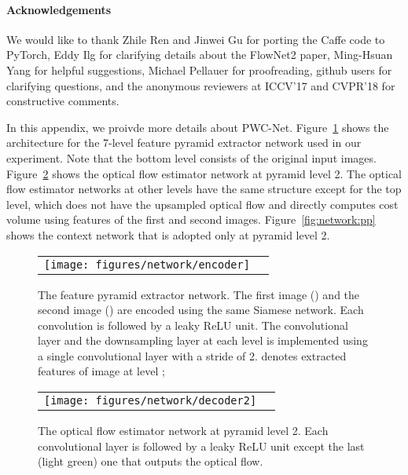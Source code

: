 \documentclass[10pt,journal,cspaper,compsoc]{IEEEtran}
\newcommand{\beforePara}{\vspace{-0em}}
\begin{document}
	\beforePara
	{
	\paragraph{Acknowledgements} We would like to thank Zhile Ren and Jinwei Gu for porting the Caffe code to PyTorch, Eddy Ilg for clarifying details about the FlowNet2 paper, Ming-Hsuan Yang for helpful suggestions, Michael Pellauer for proofreading,  github users for clarifying questions, and the anonymous reviewers at ICCV'17 and CVPR'18 for constructive comments.
	}
	



\appendix
In this appendix, we proivde more details about PWC-Net.
Figure~\ref{fig:network:encoder} shows the architecture for the 7-level feature pyramid extractor network used in our experiment. Note that the bottom level consists of the original input images. 
Figure~\ref{fig:network:decoder2} shows the optical flow estimator network at pyramid level 2. The optical flow estimator networks at other levels have the same structure except for the top level, which does not have the upsampled optical flow and directly computes cost volume using features of the first and second images. Figure~\ref{fig:network:pp} shows the context network that is adopted only at pyramid level 2. 

\begin{figure}[h]
	\begin{center}
		\newcommand{\shiftfigure}{\hspace{5mm}}
		\begin{tabular}{cc}
			\texttt{[image: figures/network/encoder]} 
		\end{tabular}
	\end{center}
	\vspace{-4mm}
	\caption{The feature pyramid extractor network. The first image () and the second image () are encoded using the same Siamese network. Each convolution is followed by a leaky ReLU unit. The convolutional layer and the  downsampling layer at each level is implemented using a single convolutional layer with a stride of 2.  denotes  extracted features of image  at level ; }
	\label{fig:network:encoder}
\end{figure}


\begin{figure}
	\begin{center}
		\newcommand{\shiftfigure}{\hspace{5mm}}
		\begin{tabular}{cc}
			\texttt{[image: figures/network/decoder2]} 
		\end{tabular}
	\end{center}
	\vspace{-4mm}
	\caption{The optical flow estimator network at pyramid level 2. Each convolutional layer is followed by a leaky ReLU unit except the last (light green) one that outputs the optical flow. }
	\label{fig:network:decoder2}
\end{figure}
\end{document}
